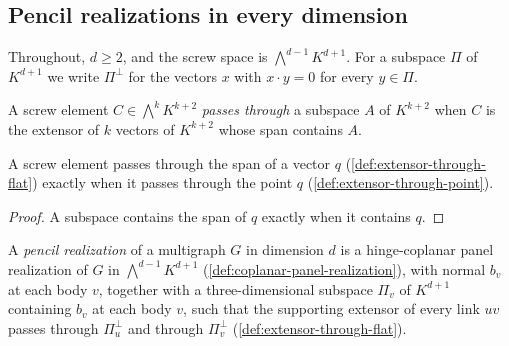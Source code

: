 \subsection{Pencil realizations in every dimension}
\label{sec:pencil-d-realization}

Throughout, $d \ge 2$, and the screw space is $\bigwedge^{d-1} K^{d+1}$.
For a subspace $\Pi$ of $K^{d+1}$ we write $\Pi^{\perp}$ for the vectors
$x$ with $x \cdot y = 0$ for every $y \in \Pi$.

\begin{definition}
  \label{def:extensor-through-flat}
  \leanok
  A screw element $C \in \bigwedge^{k} K^{k+2}$ \emph{passes through} a
  subspace $A$ of $K^{k+2}$ when $C$ is the extensor of $k$ vectors of
  $K^{k+2}$ whose span contains $A$.
\end{definition}

\begin{lemma}
  \label{lem:extensor-through-flat-point}
  \leanok
  A screw element passes through the span of a vector $q$
  (\cref{def:extensor-through-flat}) exactly when it passes through the
  point $q$ (\cref{def:extensor-through-point}).
\end{lemma}
\begin{proof}
  \leanok
  A subspace contains the span of $q$ exactly when it contains $q$.
\end{proof}

\begin{definition}
  \label{def:pencil-d-realization}
  \leanok
  A \emph{pencil realization} of a multigraph $G$ in dimension $d$ is a
  hinge-coplanar panel realization of $G$ in $\bigwedge^{d-1} K^{d+1}$
  (\cref{def:coplanar-panel-realization}), with normal $b_v$ at each
  body $v$, together with a three-dimensional subspace $\Pi_v$ of
  $K^{d+1}$ containing $b_v$ at each body $v$, such that the supporting
  extensor of every link $uv$ passes through $\Pi_u^{\perp}$ and through
  $\Pi_v^{\perp}$ (\cref{def:extensor-through-flat}).
\end{definition}

